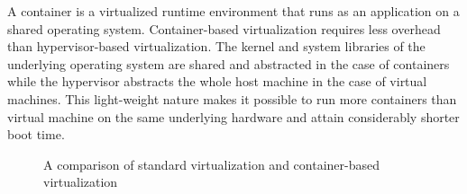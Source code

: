 A container is a virtualized runtime environment that runs as an application on a shared operating system. Container-based virtualization requires less overhead than hypervisor-based virtualization. The kernel and system libraries of the underlying operating system are shared and abstracted in the case of containers while the hypervisor abstracts the whole host machine in the case of virtual machines. This light-weight nature makes it possible to run more containers than virtual machine on the same underlying hardware and attain considerably shorter boot time.
\\
\begin{figure}[h!]
	 \hfill
\caption{A comparison of standard virtualization and container-based virtualization}
\label{request-headers}
\end{figure}

